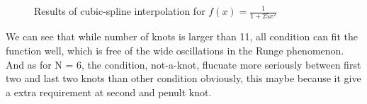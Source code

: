 \documentclass{article}
\begin{document}
\begin{figure}[h]
{    }
    \quad
\caption{Results of cubic-spline interpolation for $f(x)=\frac{1}{1+25x^2}$}
\end{figure}

We can see that while number of knots is larger than 11, all condition can fit the function well, which is free of the wide oscillations in the Runge phenomenon. And as for N = 6, the condition, not-a-knot, flucuate more seriously between first two and last two knots than other condition obviously, this maybe because it give a extra requirement at second and penult knot. 
\end{document}
